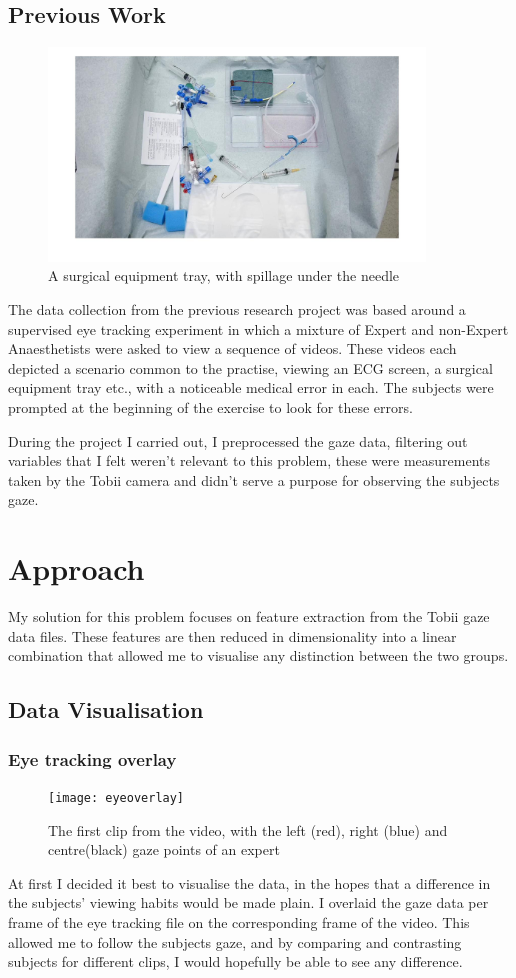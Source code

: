 \documentclass{report}
\begin{document}
{		\section{Previous Work}
			\begin{figure}[h]
				\includegraphics[width=10cm]{clip1.jpg}
				\centering
				\caption{A surgical equipment tray, with spillage under the needle}
			\end{figure}
			The data collection from the previous research project was based around a supervised eye tracking experiment in which a mixture of Expert and non-Expert Anaesthetists were asked to view a sequence of videos. These videos each depicted a scenario common to the practise, viewing an ECG screen, a surgical equipment tray etc., with a noticeable medical error in each. The subjects were prompted at the beginning of the exercise to look for these errors.
			
			During the project I carried out, I preprocessed the gaze data, filtering out variables that I felt weren't relevant to this problem, these were measurements taken by the Tobii camera and didn't serve a purpose for observing the subjects gaze.
			
	\newpage
	\chapter{Approach}
		My solution for this problem focuses on feature extraction from the Tobii gaze data files. These features are then reduced in dimensionality into a linear combination that allowed me to visualise any distinction between the two groups.
		\section{Data Visualisation}
			\subsection{Eye tracking overlay}
				\begin{figure}[h]
					\texttt{[image: eyeoverlay]}
					\centering
					\caption{The first clip from the video, with the left (red), right (blue) and centre(black) gaze points of an expert}
				\end{figure}
				At first I decided it best to visualise the data, in the hopes that a difference in the subjects' viewing habits would be made plain. I overlaid the gaze data per frame of the eye tracking file on the corresponding frame of the video. This allowed me to follow the subjects gaze, and by comparing and contrasting subjects for different clips, I would hopefully be able to see any difference. 
				
}
\end{document}
